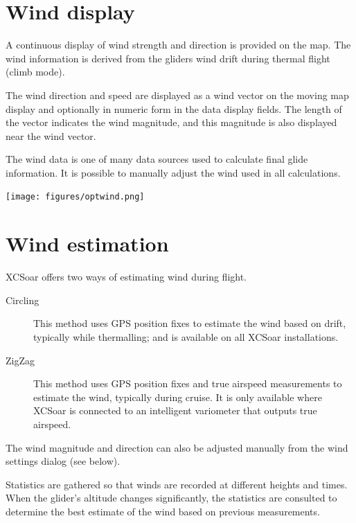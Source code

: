 \section{Wind display}

A continuous display of wind strength and direction is provided on the
map.  The wind information is derived from the gliders wind drift
during thermal flight (climb mode).

The wind direction and speed are displayed as a wind vector on the
moving map display and optionally in numeric form in the data display
fields.  The length of the vector indicates the wind magnitude, and
this magnitude is also displayed near the wind vector.

The wind data is one of many data sources used to calculate final
glide information.  It is possible to manually adjust the wind used in
all calculations.

\begin{center}
\texttt{[image: figures/optwind.png]}


\end{center}

\section{Wind estimation}\label{sec:wind-estimation}

XCSoar offers two ways of estimating wind during flight.
\begin{description}
\item[Circling]  This method uses GPS position fixes to estimate the wind
  based on drift, typically while thermalling; and is available on all
  XCSoar installations.
\item[ZigZag]  This method uses GPS position fixes and true airspeed measurements
  to estimate the wind, typically during cruise.  It is only available where
  XCSoar is connected to an intelligent variometer that outputs true airspeed.
\end{description}

The wind magnitude and direction can also be adjusted manually from the
wind settings dialog (see below).  

Statistics are gathered so that winds are recorded at different
heights and times.  When the glider's altitude changes significantly,
the statistics are consulted to determine the best estimate of the
wind based on previous measurements.


